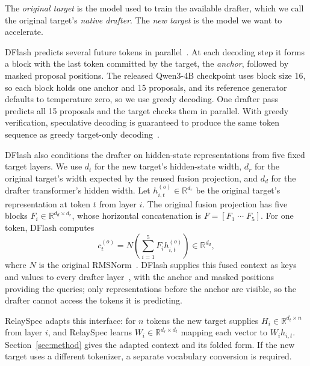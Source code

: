 \label{sec:dflash-background}
The \emph{original target} is the model used to train the available drafter, which we call the original target's \emph{native drafter}. The \emph{new target} is the model we want to accelerate.

DFlash predicts several future tokens in parallel~\citep{chen2026dflash}. At each decoding step it forms a block with the last token committed by the target, the \emph{anchor}, followed by masked proposal positions. The released Qwen3-4B checkpoint uses block size 16, so each block holds one anchor and 15 proposals, and its reference generator defaults to temperature zero, so we use greedy decoding. One drafter pass predicts all 15 proposals and the target checks them in parallel. With greedy verification, speculative decoding is guaranteed to produce the same token sequence as greedy target-only decoding~\citep{leviathan2023speculative,chen2023sampling}.

DFlash also conditions the drafter on hidden-state representations from five fixed target layers. We use $d_t$ for the new target's hidden-state width, $d_r$ for the original target's width expected by the reused fusion projection, and $d_d$ for the drafter transformer's hidden width. Let $h^{(o)}_{i,t}\in\mathbb R^{d_r}$ be the original target's representation at token $t$ from layer $i$. The original fusion projection has five blocks $F_i\in\mathbb R^{d_d\times d_r}$, whose horizontal concatenation is $F=[F_1\;\cdots\;F_5]$. For one token, DFlash computes
\begin{equation}
 c^{(o)}_t=N\!\left(\sum_{i=1}^{5}F_i h^{(o)}_{i,t}\right)\in\mathbb R^{d_d},
 \label{eq:native-fusion}
\end{equation}
where $N$ is the original RMSNorm~\citep{zhang2019rmsnorm}. DFlash supplies this fused context as keys and values to every drafter layer~\citep{chen2026dflash,vaswani2017attention}, with the anchor and masked positions providing the queries; only representations before the anchor are visible, so the drafter cannot access the tokens it is predicting.

RelaySpec adapts this interface: for $n$ tokens the new target supplies $H_i\in\mathbb R^{d_t\times n}$ from layer $i$, and RelaySpec learns $W_i\in\mathbb R^{d_r\times d_t}$ mapping each vector to $W_i h_{i,t}$. Section~\ref{sec:method} gives the adapted context and its folded form. If the new target uses a different tokenizer, a separate vocabulary conversion is required.
